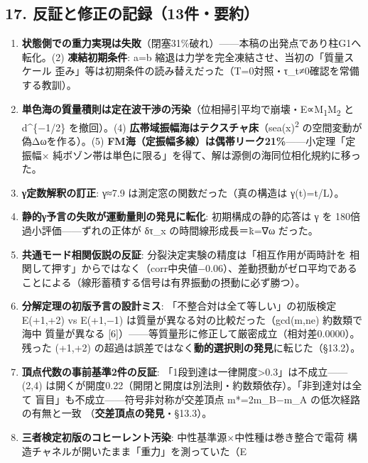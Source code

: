 \documentclass[
]{ltjarticle}
\providecommand{\tightlist}{%
  \setlength{\itemsep}{0pt}\setlength{\parskip}{0pt}}
\begin{document}
\subsection{17.
反証と修正の記録（13件・要約）}\label{ux53cdux8a3cux3068ux4feeux6b63ux306eux8a18ux933213ux4ef6ux8981ux7d04}

\begin{enumerate}
\def\labelenumi{(\arabic{enumi})}
\tightlist
\item
  \textbf{状態側での重力実現は失敗}（閉塞31\%破れ）------本稿の出発点であり柱G1へ
  転化。(2) \textbf{凍結初期条件}: a=b
  縮退は力学を完全凍結させ、当初の「質量スケール
  歪み」等は初期条件の読み替えだった（T=0対照・τ\_t≠0確認を常備する教訓）。
\item
  \textbf{単色海の質量積則は定在波干渉の汚染}（位相掃引平均で崩壊・E∝M\textsubscript{1}M\textsubscript{2}
  と d\^{}\{−1/2\} を撤回）。(4)
  \textbf{広帯域振幅海はテクスチャ床}（\textbar sea(x)\textbar{}\textsuperscript{2}
  の空間変動が 偽Δωを作る）。(5)
  \textbf{FM海（定振幅多線）は偶帯リーク21\%}------小定理「定振幅×
  純ボゾン帯は単色に限る」を得て、解は源側の海同位相化規約に移った。
\item
  \textbf{γ定数解釈の訂正}: γ≈7.9 は測定窓の関数だった（真の構造は
  γ(t)=t/L）。
\item
  \textbf{静的γ予言の失敗が運動量則の発見に転化}: 初期構成の静的応答は γ
  を 180倍過小評価------ずれの正体が δτ\_x の時間線形成長＝k̇=∇ω だった。
\item
  \textbf{共通モード相関仮説の反証}:
  分裂決定実験の精度は「相互作用が両時計を
  相関して押す」からではなく（corr中央値−0.06）、差動摂動がゼロ平均である
  ことによる（線形蓄積する信号は有界振動の摂動に必ず勝つ）。
\item
  \textbf{分解定理の初版予言の設計ミス}:
  「不整合対は全て等しい」の初版検定 E(+1,+2) vs E(+1,−1)
  は質量が異なる対の比較だった（gcd(m,ne) 約数類で海中 質量が異なる
  {[}6{]}）------等質量形に修正して厳密成立（相対差0.0000）。残った
  (+1,+2)
  の超過は誤差ではなく\textbf{動的選択則の発見}に転じた（§13.2）。
\item
  \textbf{頂点代数の事前基準2件の反証}:
  「1段到達は一律開度\textgreater0.3」は不成立------ (2,4)
  は開くが開度0.22（開閉と開度は別法則・約数類依存）。「非到達対は全て
  盲目」も不成立------符号非対称が交差頂点 m*=2m\_B−m\_A
  の低次経路の有無と一致 （\textbf{交差頂点の発見}・§13.3）。
\item
  \textbf{三者検定初版のコヒーレント汚染}:
  中性基準源×中性種は巻き整合で電荷
  構造チャネルが開いたまま「重力」を測っていた（E

\end{enumerate}
\end{document}
